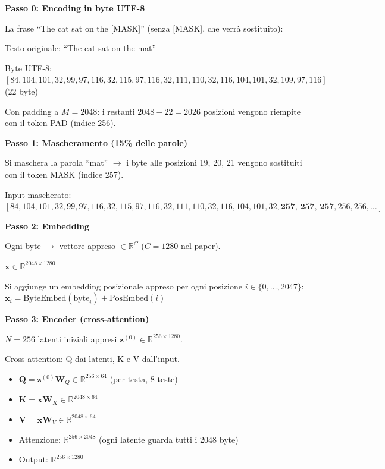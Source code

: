 \documentclass[12pt,a4paper]{article}
\begin{document}
\begin{examplebox}
\textbf{Passo 0: Encoding in byte UTF-8}

La frase ``The cat sat on the [MASK]'' (senza [MASK], che verr\`a sostituito):

Testo originale: ``The cat sat on the mat''

Byte UTF-8: $[84, 104, 101, 32, 99, 97, 116, 32, 115, 97, 116, 32, 111, 110, 32, 116, 104, 101, 32, 109, 97, 116]$ (22 byte)

Con padding a $M = 2048$: i restanti $2048 - 22 = 2026$ posizioni vengono riempite con il token PAD (indice 256).

\textbf{Passo 1: Mascheramento (15\% delle parole)}

Si maschera la parola ``mat'' $\to$ i byte alle posizioni 19, 20, 21 vengono sostituiti con il token MASK (indice 257).

Input mascherato: $[84, 104, 101, 32, 99, 97, 116, 32, 115, 97, 116, 32, 111, 110, 32, 116, 104, 101, 32, \textbf{257, 257, 257}, 256, 256, \ldots]$

\textbf{Passo 2: Embedding}

Ogni byte $\to$ vettore appreso $\in \mathbb{R}^{C}$ ($C = 1280$ nel paper).

$\mathbf{x} \in \mathbb{R}^{2048 \times 1280}$

Si aggiunge un embedding posizionale appreso per ogni posizione $i \in \{0, \ldots, 2047\}$:
$\mathbf{x}_i = \text{ByteEmbed}(\text{byte}_i) + \text{PosEmbed}(i)$

\textbf{Passo 3: Encoder (cross-attention)}

$N = 256$ latenti iniziali appresi $\mathbf{z}^{(0)} \in \mathbb{R}^{256 \times 1280}$.

Cross-attention: Q dai latenti, K e V dall'input.
\begin{itemize}
    \item $\mathbf{Q} = \mathbf{z}^{(0)} \mathbf{W}_Q \in \mathbb{R}^{256 \times 64}$ (per testa, 8 teste)
    \item $\mathbf{K} = \mathbf{x} \mathbf{W}_K \in \mathbb{R}^{2048 \times 64}$
    \item $\mathbf{V} = \mathbf{x} \mathbf{W}_V \in \mathbb{R}^{2048 \times 64}$
    \item Attenzione: $\mathbb{R}^{256 \times 2048}$ (ogni latente guarda tutti i 2048 byte)
    \item Output: $\mathbb{R}^{256 \times 1280}$
\end{itemize}


\end{examplebox}
\end{document}
